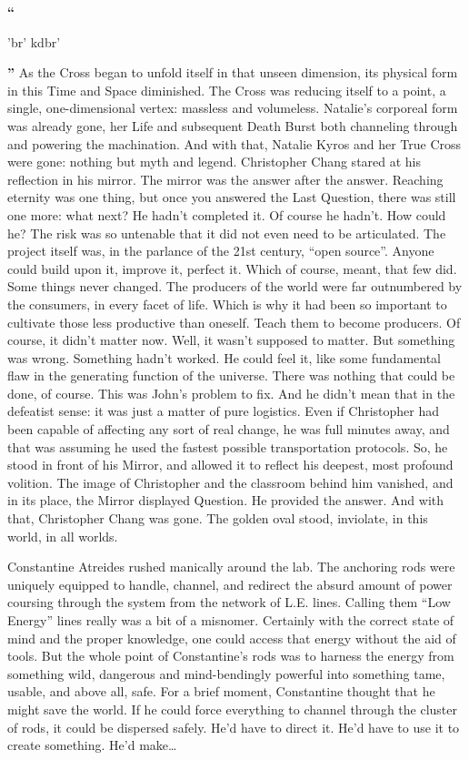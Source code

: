 \SmallVSpace
‎‎\textbf{``}\begin{cjhebrew}'br' kdbr'\end{cjhebrew}\textbf{''}
\SmallVSpace
As the Cross began to unfold itself in that unseen dimension, its physical form in this Time and Space diminished. The Cross was reducing itself to a point, a single, one-dimensional vertex: massless and volumeless. Natalie’s corporeal form was already gone, her Life and subsequent Death Burst both channeling through and powering the machination.
\SomeVSpace
And with that, Natalie Kyros and her True Cross were gone: nothing but myth and legend.
\simpleline
{}
Christopher Chang stared at his reflection in his mirror. The mirror was the answer after the answer. Reaching eternity was one thing, but once you answered the Last Question, there was still one more: what next?
\SmallVSpace
He hadn’t completed it. Of course he hadn’t. How could he? The risk was so untenable that it did not even need to be articulated. The project itself was, in the parlance of the 21st century, “open source”. Anyone could build upon it, improve it, perfect it. Which of course, meant, that few did. Some things never changed. The producers of the world were far outnumbered by the consumers, in every facet of life.
\SmallVSpace
Which is why it had been so important to cultivate those less productive than oneself. Teach them to become producers. Of course, it didn’t matter now. Well, it wasn’t supposed to matter. But something was wrong. Something hadn’t worked. He could feel it, like some fundamental flaw in the generating function of the universe.
\SmallVSpace
There was nothing that could be done, of course. This was John’s problem to fix. And he didn’t mean that in the defeatist sense: it was just a matter of pure logistics. Even if Christopher had been capable of affecting any sort of real change, he was full minutes away, and that was assuming he used the fastest possible transportation protocols.
\SmallVSpace
So, he stood in front of his Mirror, and allowed it to reflect his deepest, most profound volition. The image of Christopher and the classroom behind him vanished, and in its place, the Mirror displayed Question.
\SmallVSpace
He provided the answer. And with that, Christopher Chang was gone.
\SomeVSpace
The golden oval stood, inviolate, in this world, in all worlds.
\simpleline
{}

Constantine Atreides rushed manically around the lab. The anchoring rods were uniquely equipped to handle, channel, and redirect the absurd amount of power coursing through the system from the network of L.E. lines. Calling them “Low Energy” lines really was a bit of a misnomer. Certainly with the correct state of mind and the proper knowledge, one could access that energy without the aid of tools. But the whole point of Constantine’s rods was to harness the energy from something wild, dangerous and mind-bendingly powerful into something tame, usable, and above all, safe.
\SomeVSpace
For a brief moment, Constantine thought that he might save the world. If he could force everything to channel through the cluster of rods, it could be dispersed safely. He’d have to direct it. He’d have to use it to create something. He’d make…


